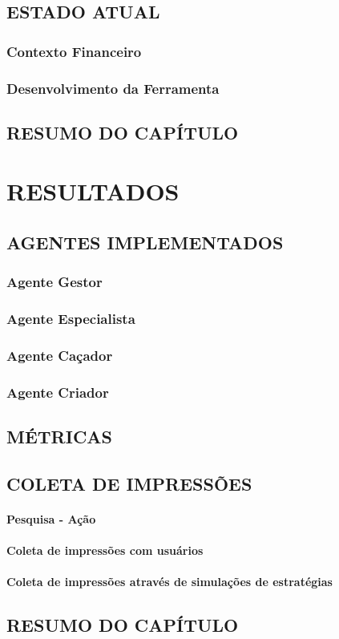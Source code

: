 \section{ESTADO ATUAL}
\subsection{Contexto Financeiro}
\subsection{Desenvolvimento da Ferramenta}
\section{RESUMO DO CAPÍTULO}

\chapter{RESULTADOS}
\section{AGENTES IMPLEMENTADOS}
\subsection{Agente Gestor}
\subsection{Agente Especialista}
\subsection{Agente Caçador}
\subsection{Agente Criador}
\section{MÉTRICAS}
\section{COLETA DE IMPRESSÕES}
\subsubsection{Pesquisa - Ação}
\subsubsection{Coleta de impressões com usuários}
\subsubsection{Coleta de impressões através de simulações de estratégias}
\section{RESUMO DO CAPÍTULO}





